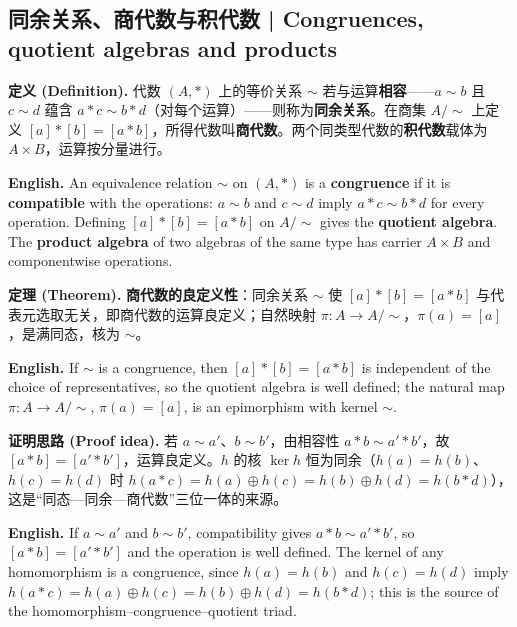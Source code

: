 \documentclass[UTF8,11pt,a4paper]{ctexart}
\newcommand{\EN}[1]{\par\noindent \textbf{English.} #1\par}
\newcommand{\DEF}[2]{\par\noindent\textbf{定义 (Definition).} #1\par\EN{#2}}
\newcommand{\THM}[2]{\par\noindent\textbf{定理 (Theorem).} #1\par\EN{#2}}
\newcommand{\PRF}[2]{\par\noindent\textbf{证明思路 (Proof idea).} #1\par\EN{#2}}
\begin{document}
\subsection{同余关系、商代数与积代数 | Congruences, quotient algebras and products}
\DEF{代数 $(A,*)$ 上的等价关系 $\sim$ 若与运算\textbf{相容}——$a\sim b$ 且 $c\sim d$ 蕴含 $a*c\sim b*d$（对每个运算）——则称为\textbf{同余关系}。在商集 $A/{\sim}$ 上定义 $[a]*[b]=[a*b]$，所得代数叫\textbf{商代数}。两个同类型代数的\textbf{积代数}载体为 $A\times B$，运算按分量进行。}{An equivalence relation $\sim$ on $(A,*)$ is a \textbf{congruence} if it is \textbf{compatible} with the operations: $a\sim b$ and $c\sim d$ imply $a*c\sim b*d$ for every operation. Defining $[a]*[b]=[a*b]$ on $A/{\sim}$ gives the \textbf{quotient algebra}. The \textbf{product algebra} of two algebras of the same type has carrier $A\times B$ and componentwise operations.}
\THM{\textbf{商代数的良定义性}：同余关系 $\sim$ 使 $[a]*[b]=[a*b]$ 与代表元选取无关，即商代数的运算良定义；自然映射 $\pi:A\to A/{\sim}$，$\pi(a)=[a]$，是满同态，核为 $\sim$。}{If $\sim$ is a congruence, then $[a]*[b]=[a*b]$ is independent of the choice of representatives, so the quotient algebra is well defined; the natural map $\pi:A\to A/{\sim}$, $\pi(a)=[a]$, is an epimorphism with kernel $\sim$.}
\PRF{若 $a\sim a'$、$b\sim b'$，由相容性 $a*b\sim a'*b'$，故 $[a*b]=[a'*b']$，运算良定义。$h$ 的核 $\ker h$ 恒为同余（$h(a)=h(b)$、$h(c)=h(d)$ 时 $h(a*c)=h(a)\oplus h(c)=h(b)\oplus h(d)=h(b*d)$），这是“同态—同余—商代数”三位一体的来源。}{If $a\sim a'$ and $b\sim b'$, compatibility gives $a*b\sim a'*b'$, so $[a*b]=[a'*b']$ and the operation is well defined. The kernel of any homomorphism is a congruence, since $h(a)=h(b)$ and $h(c)=h(d)$ imply $h(a*c)=h(a)\oplus h(c)=h(b)\oplus h(d)=h(b*d)$; this is the source of the homomorphism–congruence–quotient triad.}
\end{document}
